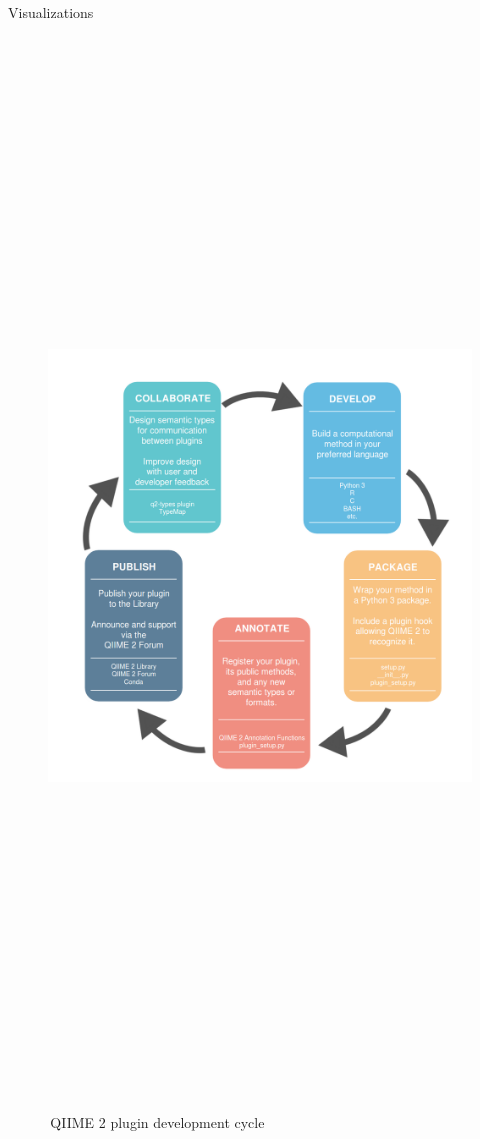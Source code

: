 \documentclass[final]{beamer}
\newlength{\colwidth}
\begin{document}
\begin{frame}[t]
\begin{columns}[t]
\begin{column}{\colwidth}
  \begin{block}{Visualizations}
    \begin{figure}[tph!]
    {\includegraphics[height=28cm]{assets/DevelopmentProcessDiagramFlattop}}
    \caption{\,QIIME 2 plugin development cycle }
    \label{fig:processDiagram}
    \end{figure}


\end{block}
\end{column}
\end{columns}
\end{frame}
\end{document}
